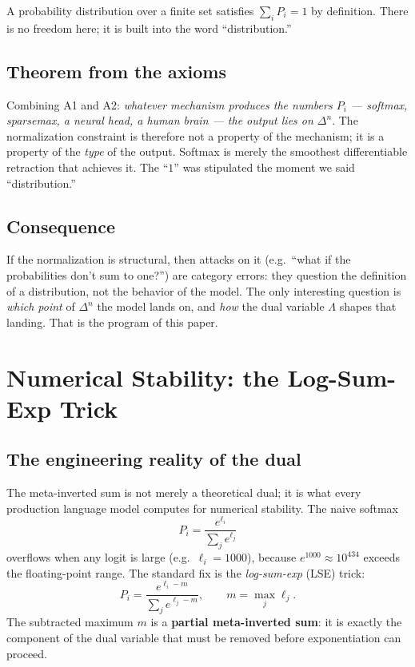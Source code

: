 \documentclass[11pt]{article}
\newcommand{\simplex}[1]{\Delta^{#1}}
\begin{document}
A probability distribution over a finite set satisfies $\sum_i P_i = 1$ by
definition. There is no freedom here; it is built into the word
``distribution.''

\subsection{Theorem from the axioms}
\label{sec:ax-thm}

Combining A1 and A2: \emph{whatever mechanism produces the numbers
$P_i$ --- softmax, sparsemax, a neural head, a human brain --- the output lies
on $\simplex{n}$}. The normalization constraint is therefore not a property of
the mechanism; it is a property of the \emph{type} of the output. Softmax is
merely the smoothest differentiable retraction that achieves it. The ``$1$''
was stipulated the moment we said ``distribution.''

\subsection{Consequence}
\label{sec:ax-cons}

If the normalization is structural, then attacks on it (e.g.\ ``what if the
probabilities don't sum to one?'') are category errors: they question the
definition of a distribution, not the behavior of the model. The only
interesting question is \emph{which point} of $\simplex{n}$ the model lands on,
and \emph{how} the dual variable $\Lambda$ shapes that landing. That is the
program of this paper.

\section{Numerical Stability: the Log-Sum-Exp Trick}
\label{sec:lse}

\subsection{The engineering reality of the dual}
\label{sec:lse-eng}

The meta-inverted sum is not merely a theoretical dual; it is what every
production language model computes for numerical stability. The naive softmax
\[
P_i = \frac{e^{\ell_i}}{\sum_j e^{\ell_j}}
\]
overflows when any logit is large (e.g.\ $\ell_i = 1000$), because
$e^{1000}\approx 10^{434}$ exceeds the floating-point range. The standard fix
is the \emph{log-sum-exp} (LSE) trick:
\[
P_i = \frac{e^{\ell_i - m}}{\sum_j e^{\ell_j - m}},
\qquad m = \max_j \ell_j.
\]
The subtracted maximum $m$ is a \textbf{partial meta-inverted sum}: it is
exactly the component of the dual variable that must be removed before
exponentiation can proceed.
\end{document}
